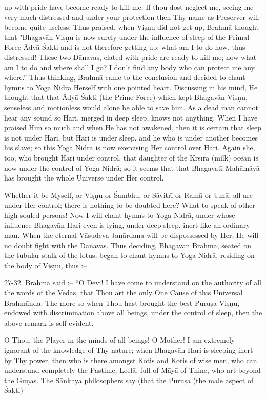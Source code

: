 up with pride have become ready to kill me. If thou dost neglect me, seeing me very much distressed and under your protection then Thy name as Preserver will become quite useless. Thus praised, when Vi\d{s}\d{n}u did not get up, Brahm\=a thought that "Bhagav\=an Vi\d{s}\d{n}u is now surely under the influence of sleep of the Primal Force \=Ady\=a \'Sakti and is not therefore getting up; what am I to do now, thus distressed! These two D\=anavas, elated with pride are ready to kill me; now what am I to do and where shall I go? I don't find any body who can protect me any where.'' Thus thinking, Brahm\=a came to the conclusion and decided to chant hymns to Yoga Nidr\=a Herself with one pointed heart. Discussing in his mind, He thought that that \=Ady\=a \'Sakti (the Prime Force) which kept Bhagav\=an Vi\d{s}\d{n}u, senseless and motionless would alone be able to save him. As a dead man cannot hear any sound so Hari, merged in deep sleep, knows not anything. When I have praised Him so much and when He has not awakened, then it is certain that sleep is not under Hari, but Hari is under sleep, and he who is under another becomes his slave; so this Yoga Nidr\=a is now exercising Her control over Hari. Again she, too, who brought Hari under control, that daughter of the Krs\={\i}ra (milk) ocean is now under the control of Yoga Nidr\=a; so it seems that that Bhagavat\={\i} Mah\=am\=ay\=a has brought the whole Universe under Her control.

Whether it be Myself, or Vi\d{s}\d{n}u or \'Sambhu, or S\=avitr\={\i} or Ram\=a or Um\=a, all are under Her control; there is nothing to be doubted here? What to speak of other high souled persons! Now I will chant hymns to Yoga Nidr\=a, under whose influence Bhagav\=an Hari even is lying, under deep sleep, inert like an ordinary man. When the eternal V\=asudeva Jan\=ardana will be dispossessed by Her, He will no doubt fight with the D\=anavas. Thus deciding, Bhagav\=an Brahm\=a, seated on the tubular stalk of the lotus, began to chant hymns to Yoga Nidr\=a, residing on the body of Vi\d{s}\d{n}u, thus :--

27-32. Brahm\=a said :-- ``O Dev\={\i}! I have come to understand on the authority of all the words of the Vedas, that Thou art the only One Cause of this Universal Brahm\=anda. The more so when Thou hast brought the best Puru\d{s}a Vi\d{s}\d{n}u, endowed with discrimination above all beings, under the control of sleep, then the above remark is self-evident.

O Thou, the Player in the minds of all beings! O Mother! I am extremely ignorant of the knowledge of Thy nature; when Bhagav\=an Hari is sleeping inert by Thy power, then who is there amongst Kotis and Kotis of wise men, who can understand completely the Pastime, Leel\=a, full of M\=ay\=a of Thine, who art beyond the Gu\d{n}as. The S\=ankhya philosophers say (that the Puru\d{s}a (the male aspect of \'Sakti)

